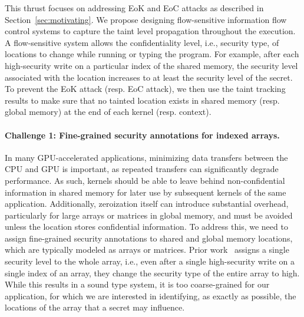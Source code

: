 This thrust focuses on addressing EoK and EoC attacks as described in Section~\ref{sec:motivating}.
%
We propose designing flow-sensitive information flow control systems to capture the taint level propagation throughout the execution.
%
A flow-sensitive system allows the confidentiality level,
i.e., security type, of locations to change while running or typing the program. 
%
For example, after each high-security write on a particular index of the shared memory, the security level associated with the location increases to at least the security level of the secret.
%
To prevent the EoK attack (resp. EoC attack), we then use the taint tracking results to make sure that no tainted location exists in shared memory (resp. global memory) at the end of each kernel (resp. context).

\paragraph{Challenge 1: Fine-grained security annotations for indexed arrays.}
%
In many GPU-accelerated applications, minimizing data transfers between the CPU and GPU is important, as repeated transfers can significantly degrade performance. As such, kernels should be able to leave behind non-confidential information in shared memory for later use by subsequent kernels of the same application. Additionally, zeroization itself can introduce substantial overhead, particularly for large arrays or matrices in global memory, and must be avoided unless the location stores confidential information.
%
To address this, we need to assign fine-grained security annotations to shared and global memory locations, which are typically modeled as arrays or matrices.
%
Prior work~\cite{?} assigns a single security level to the whole array, i.e., even after a single high-security write on a single index of an array, they change the security type of the entire array to high.
%
While this results in a sound type system, it is too coarse-grained for our application, for which we are interested in identifying, as exactly as possible, the locations of the array that a secret may influence. 
%



